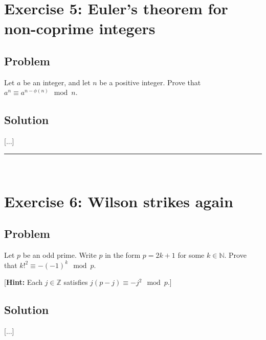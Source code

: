 \documentclass[paper=a4, fontsize=12pt]{scrartcl} %
\newcommand{\NN}{\mathbb{N}} %
\newcommand{\ZZ}{\mathbb{Z}} %
\newcommand{\tup}[1]{\left( #1 \right)}
\newcommand{\horrule}[1]{\rule{\linewidth}{#1}} %
\theoremstyle{plainsl}
\theoremstyle{definition}
\theoremstyle{remark}
\begin{document}
\section{Exercise 5: Euler's theorem for non-coprime integers}

\subsection{Problem}

Let $a$ be an integer, and let $n$ be a positive integer.
Prove that
$a^n \equiv a^{n - \phi\tup{n}} \mod n$.

\subsection{Solution}

[...]

\horrule{0.3pt} \\[0.4cm]

\section{Exercise 6: Wilson strikes again}

\subsection{Problem}

Let $p$ be an odd prime.
Write $p$ in the form $p = 2k+1$ for some $k \in \NN$.
Prove that $k!^2 \equiv - \tup{-1}^k \mod p$.

[\textbf{Hint:} Each $j \in \ZZ$ satisfies $j \tup{p-j} \equiv -j^2 \mod p$.]

\subsection{Solution}

[...]
\end{document}
